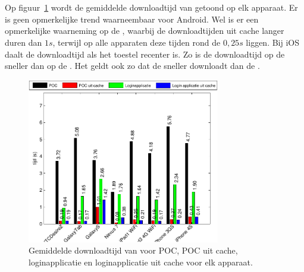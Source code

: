 
\section*{\lungo}
\label{app:performantie-lungo}

Op figuur~\ref{fig:performantie-lungo} wordt de gemiddelde downloadtijd van \lungo{} getoond op elk apparaat.
Er is geen opmerkelijke trend waarneembaar voor Android.
Wel is er een opmerkelijke waarneming op de \gs{}, waarbij de downloadtijden uit cache langer duren dan $1\unit{s}$, terwijl op alle apparaten deze tijden rond de $0,25\unit{s}$ liggen.
Bij iOS daalt de downloadtijd als het toestel recenter is.
Zo is de downloadtijd op de \ipadiii{} sneller dan op de \ipadi{}.
Het geldt ook zo dat de \iphoneiv{} sneller downloadt dan de \iphoneiii{}.

\begin{figure}[H]
  \centering
  \includegraphics[width=0.75\textwidth]{figuren/performance-lungo.pdf}
  \caption{Gemiddelde downloadtijd van \lungo{} voor POC,  POC uit cache,  loginapplicatie en loginapplicatie uit cache voor elk apparaat.}
  \label{fig:performantie-lungo}
\end{figure}

